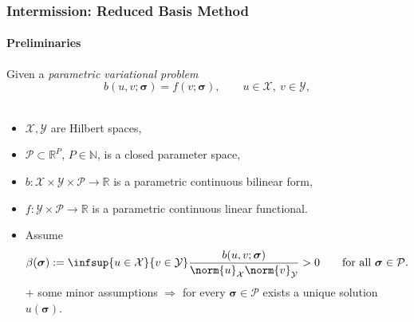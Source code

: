 \begin{frame}[t]
    \frametitle{Intermission: Reduced Basis Method}
    \framesubtitle{Preliminaries}

    Given a \emph{parametric variational problem}
    \begin{equation}
        b(u, v; \bm \sigma) = f(v; \bm \sigma), \qquad u \in \mathcal X,~v \in \mathcal Y,
    \end{equation}\\[-1em]
    \begin{itemize}
        \item $\mathcal X, \mathcal Y$ are Hilbert spaces,
        \item $\mathcal P \subset \mathbb{R}^{P}$, $P \in \mathbb{N}$, is a closed parameter space,
        \item $b \colon \mathcal X \times \mathcal Y \times \mathcal P \to \mathbb{R}$ is a parametric continuous bilinear form,
        \item $f \colon \mathcal Y \times \mathcal P \to \mathbb{R}$ is a parametric continuous linear functional.
        \item<2-> Assume
        \begin{equation}
            \beta(\bm \sigma) := \infsup{u \in \mathcal X}{v \in \mathcal Y} \frac{b(u, v; \bm \sigma)}{\norm{u}_{\mathcal X}\norm{v}_{\mathcal Y}}  > 0 \qquad \text{for all } \bm \sigma \in \mathcal P.
        \end{equation}
        $+$ some minor assumptions $\Rightarrow$ for every $\bm \sigma \in \mathcal P$ exists a unique solution $u(\bm \sigma)$.
    \end{itemize}
\end{frame}

